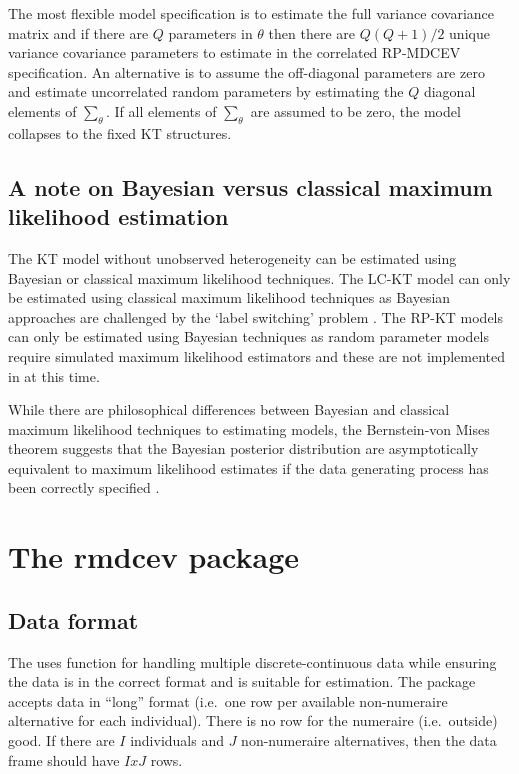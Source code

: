 The most flexible model specification is to estimate the full variance
covariance matrix and if there are \(Q\) parameters in \(\theta\) then
there are \(Q(Q+1)/2\) unique variance covariance parameters to estimate
in the correlated RP-MDCEV specification. An alternative is to assume
the off-diagonal parameters are zero and estimate uncorrelated random
parameters by estimating the \(Q\) diagonal elements of
\(\sum_{\theta}\). If all elements of \(\sum_{\theta}\) are assumed to
be zero, the model collapses to the fixed KT structures.

\hypertarget{a-note-on-bayesian-versus-classical-maximum-likelihood-estimation}{%
\subsection{A note on Bayesian versus classical maximum likelihood
estimation}\label{a-note-on-bayesian-versus-classical-maximum-likelihood-estimation}}

The KT model without unobserved heterogeneity can be estimated using
Bayesian or classical maximum likelihood techniques. The LC-KT model can
only be estimated using classical maximum likelihood techniques as
Bayesian approaches are challenged by the `label switching' problem
\citep{jasra2005}. The RP-KT models can only be estimated using Bayesian
techniques as random parameter models require simulated maximum
likelihood estimators and these are not implemented in  at
this time.

While there are philosophical differences between Bayesian and classical
maximum likelihood techniques to estimating models, the Bernstein-von
Mises theorem suggests that the Bayesian posterior distribution are
asymptotically equivalent to maximum likelihood estimates if the data
generating process has been correctly specified
\citep{traindiscrete2003}.

\hypertarget{rmdcev}{%
\section{The rmdcev package}\label{rmdcev}}

\hypertarget{data-format}{%
\subsection{Data format}\label{data-format}}

The  uses  function for handling multiple
discrete-continuous data while ensuring the data is in the correct
format and is suitable for estimation. The  package accepts
data in ``long'' format (i.e.~one row per available non-numeraire
alternative for each individual). There is no row for the numeraire
(i.e.~outside) good. If there are \(I\) individuals and \(J\)
non-numeraire alternatives, then the data frame should have \(IxJ\)
rows.

